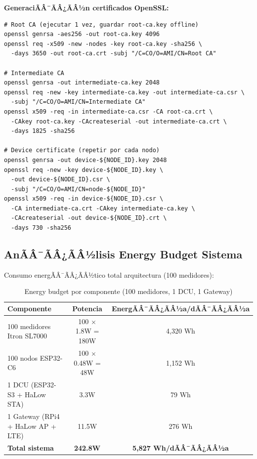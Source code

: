 \textbf{GeneraciÃÂ¯ÃÂ¿ÃÂ½n certificados OpenSSL:}

\begin{verbatim}
# Root CA (ejecutar 1 vez, guardar root-ca.key offline)
openssl genrsa -aes256 -out root-ca.key 4096
openssl req -x509 -new -nodes -key root-ca.key -sha256 \
  -days 3650 -out root-ca.crt -subj "/C=CO/O=AMI/CN=Root CA"

# Intermediate CA
openssl genrsa -out intermediate-ca.key 2048
openssl req -new -key intermediate-ca.key -out intermediate-ca.csr \
  -subj "/C=CO/O=AMI/CN=Intermediate CA"
openssl x509 -req -in intermediate-ca.csr -CA root-ca.crt \
  -CAkey root-ca.key -CAcreateserial -out intermediate-ca.crt \
  -days 1825 -sha256

# Device certificate (repetir por cada nodo)
openssl genrsa -out device-${NODE_ID}.key 2048
openssl req -new -key device-${NODE_ID}.key \
  -out device-${NODE_ID}.csr \
  -subj "/C=CO/O=AMI/CN=node-${NODE_ID}"
openssl x509 -req -in device-${NODE_ID}.csr \
  -CA intermediate-ca.crt -CAkey intermediate-ca.key \
  -CAcreateserial -out device-${NODE_ID}.crt \
  -days 730 -sha256
\end{verbatim}

\subsection{AnÃÂ¯ÃÂ¿ÃÂ½lisis Energy Budget Sistema}

Consumo energÃÂ¯ÃÂ¿ÃÂ½tico total arquitectura (100 medidores):

\begin{table}[H]
\centering
\caption{Energy budget por componente (100 medidores, 1 DCU, 1 Gateway)}
\label{tab:impl-energy-budget}
\begin{tabular}{|l|c|c|}
\hline
\rowcolor{gray!20}
\textbf{Componente} & \textbf{Potencia} & \textbf{EnergÃÂ¯ÃÂ¿ÃÂ½a/dÃÂ¯ÃÂ¿ÃÂ½a} \\
\hline
100 medidores Itron SL7000 & 100 $\times$ 1.8W = 180W & 4,320 Wh \\
\hline
100 nodos ESP32-C6 & 100 $\times$ 0.48W = 48W & 1,152 Wh \\
\hline
1 DCU (ESP32-S3 + HaLow STA) & 3.3W & 79 Wh \\
\hline
1 Gateway (RPi4 + HaLow AP + LTE) & 11.5W & 276 Wh \\
\hline
\rowcolor{yellow!20}
\textbf{Total sistema} & \textbf{242.8W} & \textbf{5,827 Wh/dÃÂ¯ÃÂ¿ÃÂ½a} \\
\hline
\end{tabular}
\end{table}

